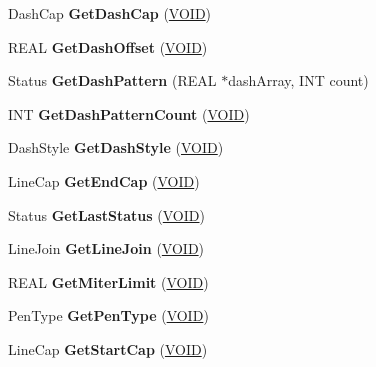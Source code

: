 \begin{DoxyCompactItemize}
\item 
\mbox{\label{class_pen_abfd1a7273ccb32978052679c3c28a34e}} 
Dash\+Cap {\bfseries Get\+Dash\+Cap} (\hyperlink{interfacevoid}{V\+O\+ID})
\item 
\mbox{\label{class_pen_a1ac3373dbb06aeced158cd689237bd1f}} 
R\+E\+AL {\bfseries Get\+Dash\+Offset} (\hyperlink{interfacevoid}{V\+O\+ID})
\item 
\mbox{\label{class_pen_a0b9fb04cfe5caa0cb8a3b6b7f4271789}} 
Status {\bfseries Get\+Dash\+Pattern} (R\+E\+AL $\ast$dash\+Array, I\+NT count)
\item 
\mbox{\label{class_pen_acebc6b867c1de9206ad12de88de8fe7c}} 
I\+NT {\bfseries Get\+Dash\+Pattern\+Count} (\hyperlink{interfacevoid}{V\+O\+ID})
\item 
\mbox{\label{class_pen_ae08aa6ac8b8443bbf3150ad11a0133fb}} 
Dash\+Style {\bfseries Get\+Dash\+Style} (\hyperlink{interfacevoid}{V\+O\+ID})
\item 
\mbox{\label{class_pen_aacc54243df8c60a1340ace9cc619448f}} 
Line\+Cap {\bfseries Get\+End\+Cap} (\hyperlink{interfacevoid}{V\+O\+ID})
\item 
\mbox{\label{class_pen_a137ca46f5624678208ebc3c327786bdf}} 
Status {\bfseries Get\+Last\+Status} (\hyperlink{interfacevoid}{V\+O\+ID})
\item 
\mbox{\label{class_pen_ac61d8b8ef74c064de26c88095e15fa76}} 
Line\+Join {\bfseries Get\+Line\+Join} (\hyperlink{interfacevoid}{V\+O\+ID})
\item 
\mbox{\label{class_pen_a7b9c6ecb428f04cc9a55e691b7f97590}} 
R\+E\+AL {\bfseries Get\+Miter\+Limit} (\hyperlink{interfacevoid}{V\+O\+ID})
\item 
\mbox{\label{class_pen_a5afc15cffa45c2c64da3c9f7a8e4c832}} 
Pen\+Type {\bfseries Get\+Pen\+Type} (\hyperlink{interfacevoid}{V\+O\+ID})
\item 
\mbox{\label{class_pen_a7bc09fe23969d023f6d0af374d445966}} 
Line\+Cap {\bfseries Get\+Start\+Cap} (\hyperlink{interfacevoid}{V\+O\+ID})

\end{DoxyCompactItemize}
